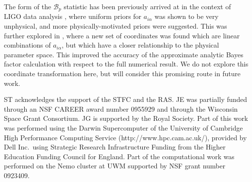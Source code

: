 \documentclass[prd,twocolumn,showpacs,nofootinbib]{revtex4}
\begin{document}
The form of the $\mathcal{B}_p$ statistic has been previously arrived at in the context of LIGO data analysis \citep{prix_bp}, where uniform priors for $a_{i\alpha}$ was shown to be very unphysical, and more physically-motivated priors were suggested. This was further explored in \citet{whelan2014}, where a new set of coordinates was found which are linear combinations of $a_{i\alpha}$, but which have a closer relationship to the physical parameter space. This improved the accuracy of the approximate analytic Bayes factor calculation with respect to the full numerical result. We do not explore this coordinate transformation here, but will consider this promising route in future work.







\acknowledgements
ST acknowledges the support of the STFC and the RAS. JE was partially funded through an NSF CAREER award number 0955929 and through the Wisconsin Space Grant Consortium. JG is supported by the Royal Society. Part of this work was performed using the Darwin Supercomputer of the University of Cambridge High Performance Computing Service (http://www.hpc.cam.ac.uk/), provided by Dell Inc.\ using Strategic Research Infrastructure Funding from the Higher Education Funding Council for England. Part of the computational work was performed on the Nemo cluster at UWM supported by NSF grant number 0923409.



\end{document}
